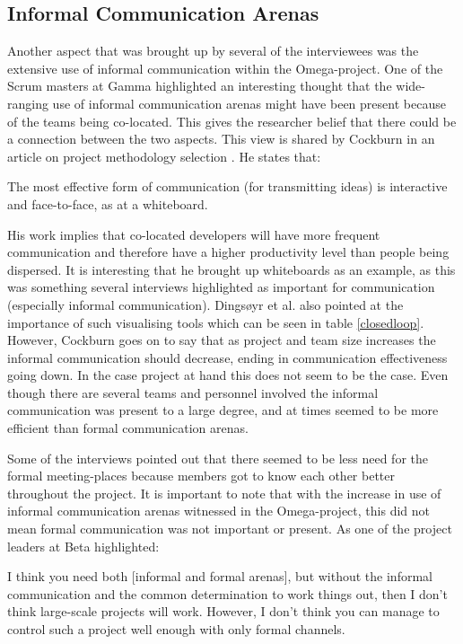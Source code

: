 \subsection{Informal Communication Arenas}

Another aspect that was brought up by several of the interviewees was the extensive use of informal communication within the Omega-project. One of the Scrum masters at Gamma highlighted an interesting thought that the wide-ranging use of informal communication arenas might have been present because of the teams being co-located. This gives the researcher belief that there could be a connection between the two aspects. This view is shared by Cockburn in an article on project methodology selection \cite{}. He states that:


\begin{fancyquotes}
The most effective form of communication (for transmitting ideas) is interactive and face-to-face, as at a whiteboard.
\end{fancyquotes}

His work implies that co-located developers will have more frequent communication and therefore have a higher productivity level than people being dispersed. It is interesting that he brought up whiteboards as an example, as this was something several interviews highlighted as important for communication (especially informal communication). Dingsøyr et al. \cite{Dingsoyr2013c} also pointed at the importance of such visualising tools which can be seen in table \ref{closedloop}. However, Cockburn goes on to say that as project and team size increases the informal communication should decrease, ending in communication effectiveness going down. In the case project at hand this does not seem to be the case. Even though there are several teams and personnel involved the informal communication was present to a large degree, and at times seemed to be more efficient than formal communication arenas.

Some of the interviews pointed out that there seemed to be less need for the formal meeting-places because members got to know each other better throughout the project. It is important to note that with the increase in use of informal communication arenas witnessed in the Omega-project, this did not mean formal communication was not important or present. As one of the project leaders at Beta highlighted:

\begin{fancyquotes}
I think you need both [informal and formal arenas], but without the informal communication and the common determination to work things out, then I don't think large-scale projects will work. However, I don't think you can manage to control such a project well enough with only formal channels.
\end{fancyquotes}

